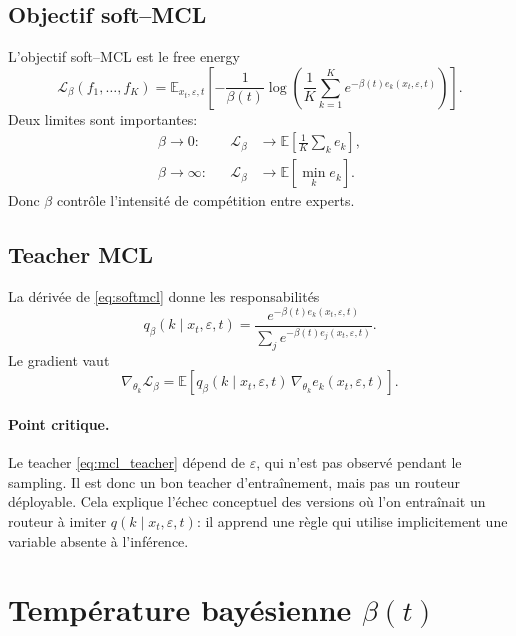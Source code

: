 \documentclass[11pt,a4paper]{article}
\newcommand{\E}{\mathbb{E}}
\newcommand{\1}{\mathbf{1}}
\newcommand{\eps}{\varepsilon}
\newcommand{\xt}{x_t}
\begin{document}
\subsection{Objectif soft--MCL}

L'objectif soft--MCL est le free energy
\begin{equation}
\mathcal L_\beta(f_1,\dots,f_K)
=\E_{\xt,\eps,t}\left[-\frac1{\beta(t)}\log\left(\frac1K\sum_{k=1}^K e^{-\beta(t)e_k(\xt,\eps,t)}\right)\right].
\label{eq:softmcl}
\end{equation}
Deux limites sont importantes:
\begin{align}
\beta\to 0:
&&
\mathcal L_\beta&\to \E\left[\frac1K\sum_k e_k\right],
\label{eq:beta0}\\
\beta\to\infty:
&&
\mathcal L_\beta&\to \E\left[\min_k e_k\right].
\label{eq:betainf}
\end{align}
Donc $\beta$ contrôle l'intensité de compétition entre experts.

\subsection{Teacher MCL}

La dérivée de \eqref{eq:softmcl} donne les responsabilités
\begin{equation}
q_\beta(k\mid \xt,\eps,t)
=\frac{e^{-\beta(t)e_k(\xt,\eps,t)}}{\sum_j e^{-\beta(t)e_j(\xt,\eps,t)}}.
\label{eq:mcl_teacher}
\end{equation}
Le gradient vaut
\begin{equation}
\nabla_{\theta_k}\mathcal L_\beta
=\E\left[q_\beta(k\mid\xt,\eps,t)\,\nabla_{\theta_k}e_k(\xt,\eps,t)\right].
\label{eq:mcl_grad}
\end{equation}

\paragraph{Point critique.}
Le teacher \eqref{eq:mcl_teacher} dépend de $\eps$, qui n'est pas observé pendant le sampling. Il est donc un bon teacher d'entraînement, mais pas un routeur déployable. Cela explique l'échec conceptuel des versions où l'on entraînait un routeur à imiter $q(k\mid\xt,\eps,t)$: il apprend une règle qui utilise implicitement une variable absente à l'inférence.

\section{Température bayésienne $\beta(t)$}
\end{document}
